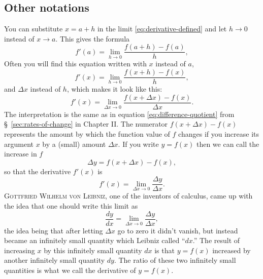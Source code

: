 \upshape

\subsection{Other notations}\label{sec:other-notations}
You can substitute $x=a+h$ in the limit \eqref{eq:derivative-defined}
and let $h\to0$ instead of $x\to a$.  This gives the formula
\begin{equation}\label{eq:derivative-defined-a-plus-h}
  f'(a) = \lim_{h\to 0} \frac{f(a+h)-f(a)}{h}, 
\end{equation}
Often you will find this equation written with $x$ instead of $a$,
\begin{equation}\label{eq:derivative-defined-x-plus-h}
  f'(x) = \lim_{h\to 0} \frac{f(x+h)-f(x)}{h}, 
\end{equation}
and $\Delta x$ instead of $h$, which makes it look like this:
\begin{equation}\label{eq:derivative-defined-x-plus-Dx}
f'(x) = \lim_{\Delta x\to0} \frac{f(x+\Delta x) - f(x)}{\Delta x}.
\end{equation}
The interpretation is the same as in equation \eqref{eq:difference-quotient}
from \S~\ref{sec:rates-of-change} in Chapter II.  The numerator $f(x+\Delta x) -
f(x)$ represents the amount by which the function value of $f$ changes if you
increase its argument $x$ by a (small) amount $\Delta x$.  If you write $y=f(x)$
then we can call the increase in $f$
\[
\Delta y = f(x+\Delta x) - f(x),
\]
so that the derivative $f'(x)$ is
\[
f'(x) = \lim_{\Delta x\to0}\frac{\Delta y}{\Delta x}.
\]
\textsc{Gottfried Wilhelm von Leibniz}, one of the inventors of calculus,
came up with the idea that one should write this limit as
\[
\frac{dy}{dx}= \lim_{\Delta x\to0}\frac{\Delta y}{\Delta x},
\]
the idea being that after letting $\Delta x$ go to zero it didn't vanish,
but instead became an infinitely small quantity which Leibniz called
``$dx$.''  The result of increasing $x$ by this infinitely small quantity
$dx$ is that $y=f(x)$ increased by another infinitely small quantity $dy$.
The ratio of these two infinitely small quantities is what we call the
derivative of $y=f(x)$.

